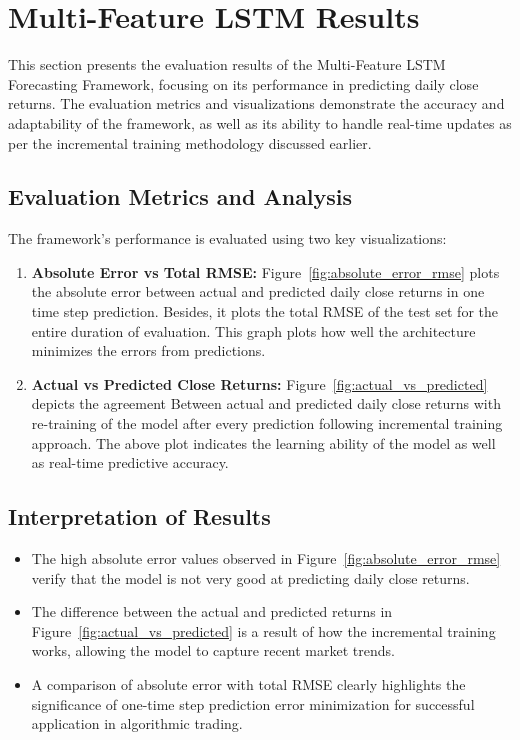 \section{Multi-Feature LSTM Results}
This section presents the evaluation results of the Multi-Feature LSTM Forecasting Framework, focusing on its performance in predicting daily close returns. The evaluation metrics and visualizations demonstrate the accuracy and adaptability of the framework, as well as its ability to handle real-time updates as per the incremental training methodology discussed earlier.

\subsection{Evaluation Metrics and Analysis}
The framework's performance is evaluated using two key visualizations:
\begin{enumerate}
    \item \textbf{Absolute Error vs Total RMSE:} Figure~\ref{fig:absolute_error_rmse} plots the absolute error between actual and predicted daily close returns in one time step prediction. Besides, it plots the total RMSE of the test set for the entire duration of evaluation. This graph plots how well the architecture minimizes the errors from predictions.

    \item \textbf{Actual vs Predicted Close Returns:} Figure~\ref{fig:actual_vs_predicted} depicts the agreement
Between actual and predicted daily close returns with re-training of the model after every prediction following incremental training approach. The above plot indicates the learning ability of the model as well as real-time predictive accuracy.
\end{enumerate}

\subsection{Interpretation of Results}
\begin{itemize}
    \item The high absolute error values observed in Figure~\ref{fig:absolute_error_rmse} verify that the model is not very good at predicting daily close returns.
    \item The difference between the actual and predicted returns in  Figure~\ref{fig:actual_vs_predicted} is a result of how the incremental training works, allowing the model to capture recent market trends.
    \item A comparison of absolute error with total RMSE clearly highlights the significance of one-time step prediction error minimization for successful application in algorithmic trading.
\end{itemize}

